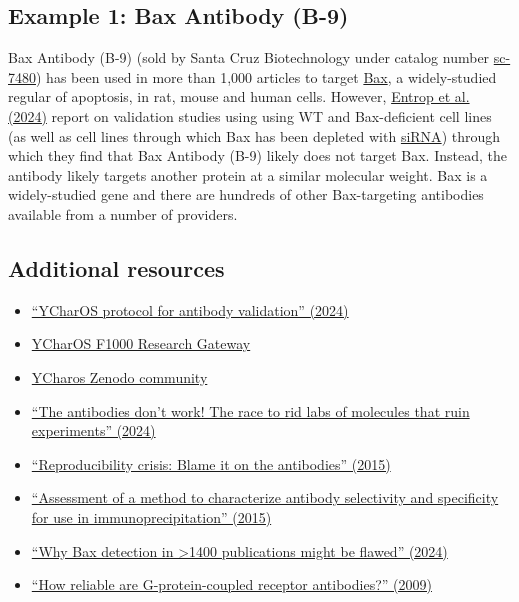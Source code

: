 \documentclass[letterpaper, 12pt]{article}
\begin{document}
\subsection*{Example 1: Bax Antibody (B-9)}

Bax Antibody (B-9) (sold by Santa Cruz Biotechnology under catalog number \href{https://www.scbt.com/p/bax-antibody-b-9}{sc-7480}) has been used in more than 1,000 articles to target \href{https://en.wikipedia.org/wiki/Apoptosis_regulator_BAX}{Bax}, a widely-studied regular of apoptosis, in rat, mouse and human cells. However, \href{https://doi.org/10.1038/s41419-024-07273-6}{Entrop et al. (2024)} report on validation studies using using WT and Bax-deficient cell lines (as well as cell lines through which Bax has been depleted with \href{https://en.wikipedia.org/wiki/Small_interfering_RNA}{siRNA}) through which they find that Bax Antibody (B-9) likely does not target Bax. Instead, the antibody likely targets another protein at a similar molecular weight. Bax is a widely-studied gene and there are hundreds of other Bax-targeting antibodies available from a number of providers.

\subsection*{Additional resources}

\begin{itemize}
    \setlength\itemsep{-0.5em}
    \item \href{https://doi.org/10.1038/s41596-024-01108-6}{``YCharOS protocol for antibody validation'' (2024)}
    \item \href{https://f1000research.com/ycharos}{YCharOS F1000 Research Gateway}
    \item \href{https://zenodo.org/communities/ycharos/records?q=&l=list&p=1&s=10&sort=newest}{YCharos Zenodo community}
    \item \href{https://doi.org/10.1038/d41586-024-03590-0}{``The antibodies don’t work! The race to rid labs of molecules that ruin experiments'' (2024)}
    \item \href{https://doi.org/10.1038/521274a}{``Reproducibility crisis: Blame it on the antibodies'' (2015)}
    \item \href{https://doi.org/10.1038/nmeth.3472}{``Assessment of a method to characterize antibody selectivity and specificity for use in immunoprecipitation'' (2015)}
    \item \href{https://doi.org/10.1038/s41419-024-07273-6}{``Why Bax detection in >1400 publications might be flawed'' (2024)}
    \item \href{https://doi.org/10.1007/s00210-009-0395-y}{``How reliable are G-protein-coupled receptor antibodies?'' (2009)}
\end{itemize}
\end{document}
